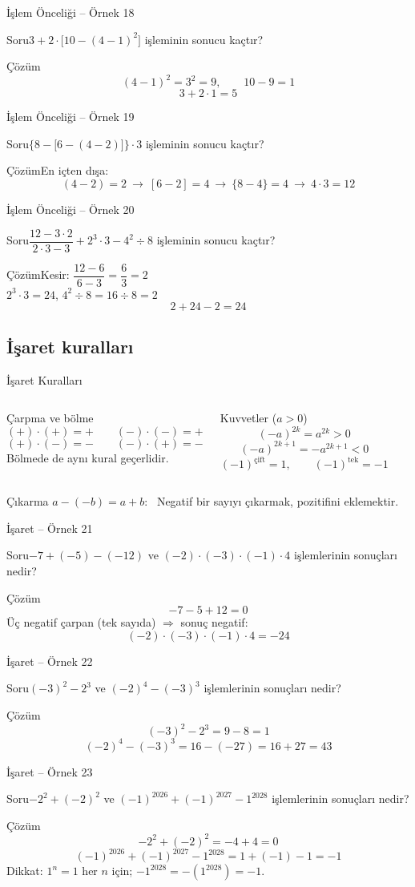 \documentclass[aspectratio=169,11pt]{beamer}
\newcommand{\soru}[3]{%
\begin{frame}{#1}
  \begin{block}{Soru}\large #2\end{block}
  \pause
  \begin{exampleblock}{Çözüm}\large #3\end{exampleblock}
\end{frame}}
\begin{document}
\soru{İşlem Önceliği -- Örnek 18}
{\(3+2\cdot\big[10-(4-1)^2\big]\) işleminin sonucu kaçtır?}
{\[(4-1)^2=3^2=9,\qquad 10-9=1\]
\[3+2\cdot 1=5\]}

\soru{İşlem Önceliği -- Örnek 19}
{\(\big\{8-\big[6-(4-2)\big]\big\}\cdot 3\) işleminin sonucu kaçtır?}
{En içten dışa:
\[(4-2)=2\ \rightarrow\ [6-2]=4\ \rightarrow\ \{8-4\}=4\ \rightarrow\ 4\cdot 3=12\]}

\soru{İşlem Önceliği -- Örnek 20}
{\(\dfrac{12-3\cdot 2}{2\cdot 3-3}+2^3\cdot 3-4^2\div 8\) işleminin sonucu kaçtır?}
{Kesir: \(\dfrac{12-6}{6-3}=\dfrac{6}{3}=2\)\\[3pt]
\(2^3\cdot 3=24\), \quad \(4^2\div 8=16\div 8=2\)
\[2+24-2=24\]}

\subsection{İşaret kuralları}
\begin{frame}{İşaret Kuralları}
\begin{columns}[t]
\begin{block}{Çarpma ve bölme}
\[(+)\cdot(+)=+\qquad (-)\cdot(-)=+\]
\[(+)\cdot(-)=-\qquad (-)\cdot(+)=-\]
Bölmede de aynı kural geçerlidir.
\end{block}
\begin{block}{Kuvvetler (\(a>0\))}
\[(-a)^{2k}=a^{2k}>0\]
\[(-a)^{2k+1}=-a^{2k+1}<0\]
\[(-1)^{\text{çift}}=1,\qquad (-1)^{\text{tek}}=-1\]
\end{block}
\end{columns}
\begin{alertblock}{Çıkarma}
\(a-(-b)=a+b\): \ Negatif bir sayıyı çıkarmak, pozitifini eklemektir.
\end{alertblock}
\end{frame}

\soru{İşaret -- Örnek 21}
{\(-7+(-5)-(-12)\) ve \((-2)\cdot(-3)\cdot(-1)\cdot 4\) işlemlerinin sonuçları nedir?}
{\[-7-5+12=0\]
Üç negatif çarpan (tek sayıda) \(\Rightarrow\) sonuç negatif:
\[(-2)\cdot(-3)\cdot(-1)\cdot 4=-24\]}

\soru{İşaret -- Örnek 22}
{\((-3)^2-2^3\) ve \((-2)^4-(-3)^3\) işlemlerinin sonuçları nedir?}
{\[(-3)^2-2^3=9-8=1\]
\[(-2)^4-(-3)^3=16-(-27)=16+27=43\]}

\soru{İşaret -- Örnek 23}
{\(-2^2+(-2)^2\) ve \((-1)^{2026}+(-1)^{2027}-1^{2028}\) işlemlerinin sonuçları nedir?}
{\[-2^2+(-2)^2=-4+4=0\]
\[(-1)^{2026}+(-1)^{2027}-1^{2028}=1+(-1)-1=-1\]
Dikkat: \(1^{n}=1\) her \(n\) için; \(-1^{2028}=-(1^{2028})=-1\).}
\end{document}
